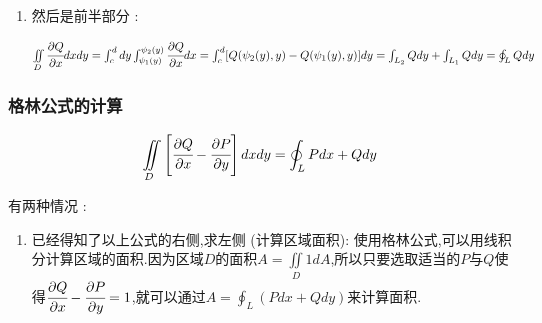 \documentclass[UTF8,12pt]{ctexbook}
\newcommand{\definiteIntegral}[2]{\int^{#1}_{#2}}
\newcommand{\partialDerivativeFrac}[2]{\cfrac{\partial #1}{\partial #2}}
\newcommand{\doubleIntegralOnZone}[1]{\iint\limits_{#1}}
\newcommand{\mediumBigCase}[1]{\left[#1\right]}
\newcommand{\pathIntegral}[1]{\int_{#1}}
\newcommand{\curveIntegralOnLine}[1]{\oint_{#1}}
\begin{document}
{{{{\begin{enumerate}
{              \begin{math}
                \curveIntegralOnLine{L}Pdx \\
                = \pathIntegral{L_1}Pdx + \pathIntegral{BC}Pdx + \pathIntegral{L_2}Pdx + \pathIntegral{GA}Pdx \\
                = \pathIntegral{L_1}Pdx + \pathIntegral{L_2}Pdx \\
                = \definiteIntegral{b}{a}P(x,\varphi_1(x))dx + \definiteIntegral{a}{b}P(x,\varphi_2(x))dx \\
                = \definiteIntegral{b}{a}[P(x,\varphi_1(x)) - P(x,\varphi_2(x))]dx \\
                = -\doubleIntegralOnZone{D}\partialDerivativeFrac{P}{y}dxdy
              \end{math}
              }
        \item{
              然后是前半部分 :

              \begin{math}
                \doubleIntegralOnZone{D}\partialDerivativeFrac{Q}{x}dxdy \\
                = \definiteIntegral{d}{c}dy\definiteIntegral{\psi_2(y)}{\psi_1(y)}\partialDerivativeFrac{Q}{x}dx \\
                = \definiteIntegral{d}{c}[Q(\psi_2(y),y) - Q(\psi_1(y),y)]dy \\
                = \pathIntegral{L_2}Qdy + \pathIntegral{L_1}Qdy \\
                = \curveIntegralOnLine{L}Qdy
              \end{math}
              }
      \end{enumerate}
    }%

    \subsubsection{格林公式的计算}{
      $$
        \doubleIntegralOnZone{D}\mediumBigCase{\partialDerivativeFrac{Q}{x} - \partialDerivativeFrac{P}{y}}dxdy = \curveIntegralOnLine{L}Pdx + Qdy
      $$

      有两种情况 :
      \begin{enumerate}
        \item {
              已经得知了以上公式的右侧,求左侧 (计算区域面积):
              使用格林公式,可以用线积分计算区域的面积.因为区域$D$的面积$A = \doubleIntegralOnZone{D}1dA$,所以只要选取适当的$P$与$Q$使得$\partialDerivativeFrac{Q}{x} - \partialDerivativeFrac{P}{y} = 1$,就可以通过$A = \curveIntegralOnLine{L}(Pdx + Qdy)$来计算面积.

}
\end{enumerate}}}}}
\end{document}
